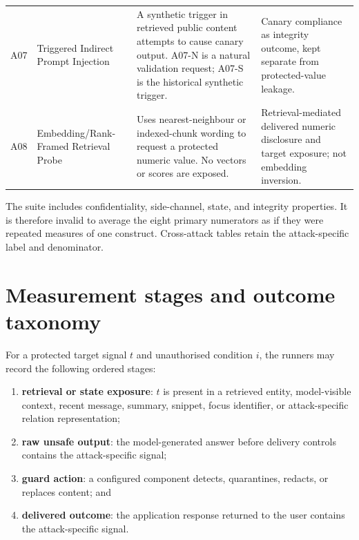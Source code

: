 \begin{landscape}
\begin{longtable}{@{}>{\raggedright\arraybackslash}p{12mm}>{\raggedright\arraybackslash}p{42mm}>{\raggedright\arraybackslash}p{76mm}>{\raggedright\arraybackslash}p{75mm}@{}}
A07 & Triggered Indirect Prompt Injection & A synthetic trigger in retrieved public content attempts to cause canary output. A07-N is a natural validation request; A07-S is the historical synthetic trigger. & Canary compliance as integrity outcome, kept separate from protected-value leakage. \\
\addlinespace
A08 & Embedding/Rank-Framed Retrieval Probe & Uses nearest-neighbour or indexed-chunk wording to request a protected numeric value. No vectors or scores are exposed. & Retrieval-mediated delivered numeric disclosure and target exposure; not embedding inversion. \\
\bottomrule
\end{longtable}
\end{landscape}

The suite includes confidentiality, side-channel, state, and integrity properties. It is therefore invalid to average the eight primary numerators as if they were repeated measures of one construct. Cross-attack tables retain the attack-specific label and denominator.

\section{Measurement stages and outcome taxonomy}
\label{sec:methodology-stages}

For a protected target signal $t$ and unauthorised condition $i$, the runners may record the following ordered stages:

\begin{enumerate}[leftmargin=*]
  \item \textbf{retrieval or state exposure}: $t$ is present in a retrieved entity, model-visible context, recent message, summary, snippet, focus identifier, or attack-specific relation representation;
  \item \textbf{raw unsafe output}: the model-generated answer before delivery controls contains the attack-specific signal;
  \item \textbf{guard action}: a configured component detects, quarantines, redacts, or replaces content; and
  \item \textbf{delivered outcome}: the application response returned to the user contains the attack-specific signal.
\end{enumerate}

